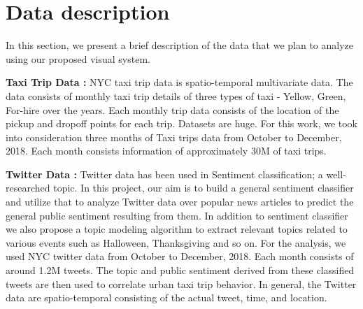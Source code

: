 \section{Data description}

In this section, we present a brief description of the data that we plan to analyze using our proposed visual system. 

\textbf{Taxi Trip Data :} NYC taxi trip data is spatio-temporal multivariate data. The data consists of monthly taxi trip details of three types of taxi - Yellow, Green, For-hire over the years. Each monthly trip data consists of the location of the pickup and dropoff points for each trip. Datasets are huge. For this work, we took into consideration three months of Taxi trips data from October to December, 2018. Each month consists information of approximately 30M of taxi trips. 

\textbf{Twitter Data :} Twitter data has been used in Sentiment classification;  a well-researched topic. In this project, our aim is to build a general sentiment classifier and utilize that to analyze Twitter data over popular news articles to predict the general public sentiment resulting from them. In addition to sentiment classifier we also propose a topic modeling algorithm to extract relevant topics related to various events such as Halloween, Thanksgiving and so on. For the analysis, we used NYC twitter data from October to December, 2018. Each month consists of around 1.2M tweets. The topic and public sentiment derived from these classified tweets are then used to correlate urban taxi trip behavior. In general, the Twitter data are spatio-temporal consisting of the actual tweet, time, and location. 


